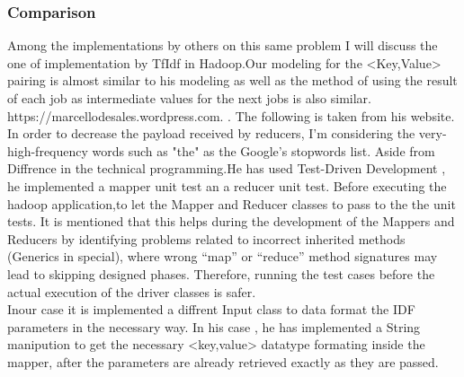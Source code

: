 \documentclass{bigdata}
\begin{document}
\subsubsection{Comparison}
Among the implementations by others on this same problem I will discuss the one of implementation by TfIdf in Hadoop.Our modeling for the <Key,Value> pairing is almost similar to his modeling as well as the method of using the result of each job as intermediate values for the next jobs is also similar. https://marcellodesales.wordpress.com. \cite{d}. The following is taken from his website.\\

In order to decrease the payload received by reducers, I'm considering the very-high-frequency words such as "the" as the Google's stopwords list.
Aside from Diffrence in the technical programming.He has used  Test-Driven Development , he implemented a mapper unit test an a reducer unit test. Before executing the hadoop application,to let the Mapper and Reducer classes to pass to the the unit tests. It is mentioned that this helps during the development of the Mappers and Reducers by identifying problems related to incorrect inherited methods (Generics in special), where wrong “map” or “reduce” method signatures may lead to skipping designed phases. Therefore, running the test cases before the actual execution of the driver classes is safer. \\
Inour case it is implemented a diffrent Input class to data format the IDF parameters in the necessary way. In his case , he has implemented a String manipution to get the necessary <key,value>  datatype formating inside the mapper, after the parameters are already retrieved exactly as they are passed.\\
\end{document}

